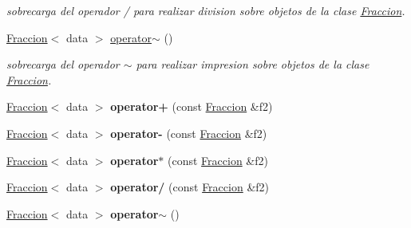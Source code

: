 \begin{DoxyCompactItemize}
\begin{DoxyCompactList}\small\item\em sobrecarga del operador / para realizar division sobre objetos de la clase \hyperlink{classFraccion}{Fraccion}. \end{DoxyCompactList}\item 
\hypertarget{classFraccion_a70811c5dfb60b21960613431d1eb9b61}{\hyperlink{classFraccion}{Fraccion}$<$ data $>$ \hyperlink{classFraccion_a70811c5dfb60b21960613431d1eb9b61}{operator$\sim$} ()}\label{classFraccion_a70811c5dfb60b21960613431d1eb9b61}

\begin{DoxyCompactList}\small\item\em sobrecarga del operador $\sim$ para realizar impresion sobre objetos de la clase \hyperlink{classFraccion}{Fraccion}. \end{DoxyCompactList}\item 
\hypertarget{classFraccion_a98cfb31dd47b9a20f0a00557145d3fa4}{\hyperlink{classFraccion}{Fraccion}$<$ data $>$ {\bfseries operator+} (const \hyperlink{classFraccion}{Fraccion} \&f2)}\label{classFraccion_a98cfb31dd47b9a20f0a00557145d3fa4}

\item 
\hypertarget{classFraccion_a70cba79aff80a5b92c56920d297ead1d}{\hyperlink{classFraccion}{Fraccion}$<$ data $>$ {\bfseries operator-\/} (const \hyperlink{classFraccion}{Fraccion} \&f2)}\label{classFraccion_a70cba79aff80a5b92c56920d297ead1d}

\item 
\hypertarget{classFraccion_abb45b637754307e9b365ba8ab3f1fb90}{\hyperlink{classFraccion}{Fraccion}$<$ data $>$ {\bfseries operator$\ast$} (const \hyperlink{classFraccion}{Fraccion} \&f2)}\label{classFraccion_abb45b637754307e9b365ba8ab3f1fb90}

\item 
\hypertarget{classFraccion_ac56ec3a54f0e238e650ea95b49118aec}{\hyperlink{classFraccion}{Fraccion}$<$ data $>$ {\bfseries operator/} (const \hyperlink{classFraccion}{Fraccion} \&f2)}\label{classFraccion_ac56ec3a54f0e238e650ea95b49118aec}

\item 
\hypertarget{classFraccion_a22552b0edf3c9141c3d80e54738e3564}{\hyperlink{classFraccion}{Fraccion}$<$ data $>$ {\bfseries operator$\sim$} ()}\label{classFraccion_a22552b0edf3c9141c3d80e54738e3564}

\end{DoxyCompactItemize}
